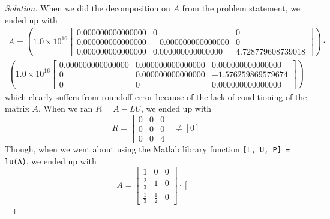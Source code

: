 \documentclass[12pt]{amsart}
\newenvironment{solution}
{\begin{proof}[Solution]}
{\end{proof}}
\begin{document}
\begin{onehalfspace}
\begin{solution}
            When we did the decomposition on $A$ from the problem statement, we ended up with
            \begin{gather*}
                A = \left(1.0\times 10^{16}\left[\begin{matrix}
                              0.000000000000000 &                  0 &                 0\\
                              0.000000000000000 & -0.000000000000000 &                 0\\
                              0.000000000000000 & 0.000000000000000 & 4.728779608739018
                \end{matrix}\right]\right)\cdot \\
                \left(1.0\times 10^{16}\left[\begin{matrix}
                              0.000000000000000 &   0.000000000000000 &  0.000000000000000\\
                              0  & 0.000000000000000 & -1.576259869579674\\
                              0  &                 0 & 0.000000000000000
                \end{matrix}\right]\right)
            \end{gather*}
            which clearly suffers from roundoff error because of the lack of conditioning of the matrix $A$.
            When we ran $R = A - LU$, we ended up with
            \begin{displaymath}
                R = \left[\begin{matrix}
                              0 & 0 & 0\\
                              0 & 0 & 0\\
                              0 & 0 & 4
                \end{matrix}\right] \neq [0]
            \end{displaymath}
            Though, when we went about using the Matlab library function \texttt{[L, U, P] = lu(A)}, we ended up with
            \begin{displaymath}
                A = \left[\begin{matrix}
                              1 & 0 & 0\\
                              \frac{2}{3} & 1 & 0\\
                              \frac{1}{3} & \frac{1}{2} & 0
                \end{matrix}\right]\cdot
                \left[\begin{matrix}

\end{matrix}
\end{displaymath}
\end{solution}
\end{onehalfspace}
\end{document}

